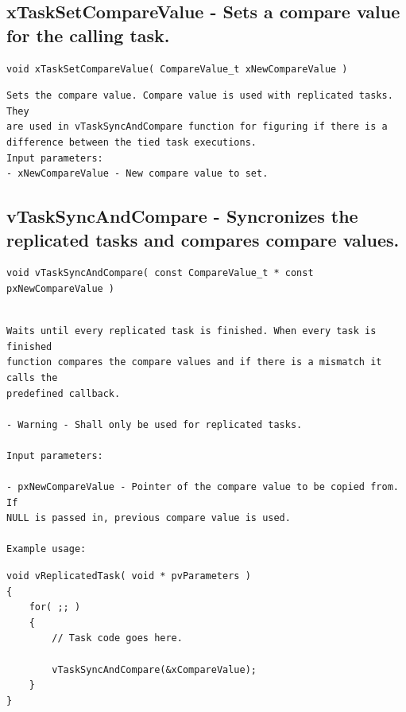 \subsection{xTaskSetCompareValue -  Sets a compare value for the calling task.}
\label{rt_cmd:xTaskSetCompareValue}

\begin{verbatim}
void xTaskSetCompareValue( CompareValue_t xNewCompareValue )

\end{verbatim}
\begin{lstlisting}
Sets the compare value. Compare value is used with replicated tasks. They
are used in vTaskSyncAndCompare function for figuring if there is a
difference between the tied task executions.
Input parameters:
- xNewCompareValue - New compare value to set.

\end{lstlisting}
\subsection{vTaskSyncAndCompare -  Syncronizes the replicated tasks and compares compare values.}
\label{rt_cmd:vTaskSyncAndCompare}

\begin{verbatim}
void vTaskSyncAndCompare( const CompareValue_t * const pxNewCompareValue )


\end{verbatim}
\begin{lstlisting}
Waits until every replicated task is finished. When every task is finished
function compares the compare values and if there is a mismatch it calls the
predefined callback.

- Warning - Shall only be used for replicated tasks.

Input parameters:

- pxNewCompareValue - Pointer of the compare value to be copied from. If
NULL is passed in, previous compare value is used.

Example usage:
\end{lstlisting}
\begin{verbatim}
void vReplicatedTask( void * pvParameters )
{
    for( ;; )
    {
        // Task code goes here.

        vTaskSyncAndCompare(&xCompareValue);
    }
}

\end{verbatim}

